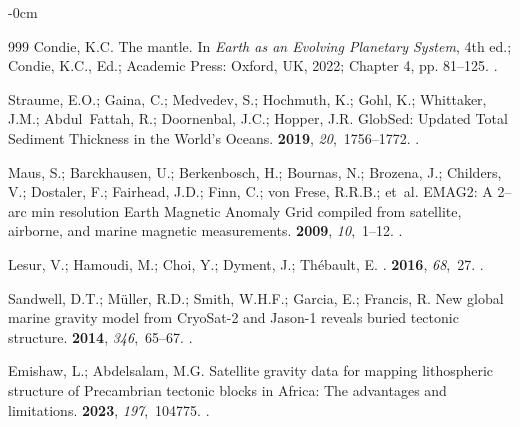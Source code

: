 \documentclass[geomatics,article,accept,pdftex,moreauthors]{Definitions/mdpi}
\begin{document}
\begin{adjustwidth}{-\extralength}{0cm}
\begin{thebibliography}{999}
Condie, K.C.
\newblock The mantle. In {\em Earth as an Evolving Planetary System}, 4th ed.;  Condie, K.C., Ed.; Academic Press: Oxford, UK, 2022; Chapter 4, pp. 81--125. %
.

Straume, E.O.; Gaina, C.; Medvedev, S.; Hochmuth, K.; Gohl, K.; Whittaker,
  J.M.; Abdul~Fattah, R.; Doornenbal, J.C.; Hopper, J.R.
\newblock GlobSed: Updated Total Sediment Thickness in the World's Oceans.
 {\bf 2019}, {\em
  20},~1756--1772.
.

Maus, S.; Barckhausen, U.; Berkenbosch, H.; Bournas, N.; Brozena, J.; Childers,
  V.; Dostaler, F.; Fairhead, J.D.; Finn, C.; von Frese, R.R.B.;  et~al.
\newblock EMAG2: A 2–arc min resolution Earth Magnetic Anomaly Grid compiled
  from satellite, airborne, and marine magnetic measurements.
 {\bf 2009}, \emph{10},~1--12. %
.

Lesur, V.; Hamoudi, M.; Choi, Y.; Dyment, J.; Thébault, E.
.
 {\bf 2016}, {\em 68},~27.
.

Sandwell, D.T.; Müller, R.D.; Smith, W.H.F.; Garcia, E.; Francis, R.
\newblock New global marine gravity model from CryoSat-2 and Jason-1 reveals
  buried tectonic structure.
 {\bf 2014}, {\em 346},~65--67.
.

Emishaw, L.; Abdelsalam, M.G.
\newblock Satellite gravity data for mapping lithospheric structure of
  Precambrian tectonic blocks in Africa: The advantages and limitations.
 {\bf 2023}, {\em
  197},~104775.
.


\end{thebibliography}
\end{adjustwidth}
\end{document}
